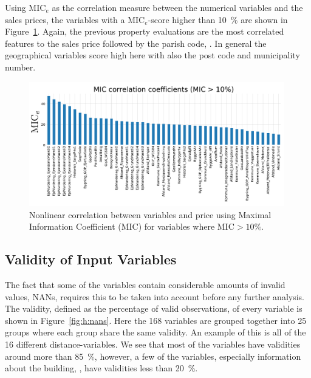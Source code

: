 Using $\mathrm{MIC}_e$ as the correlation measure between the numerical variables and the sales prices, the variables with a $\mathrm{MIC}_e$-score higher than \SI{10}{\percent} are shown in Figure~\ref{fig:h:corr_MIC}. Again, the previous property evaluations are the most correlated features to the sales price followed by the parish code, . In general the geographical variables score high here with also the post code and municipality number. 

\begin{figure}
  \centerfloat
  \includegraphics[width=0.99\textwidth, trim=0 10 0 40, clip]{figures/housing/MIC_plot.pdf}
  \caption[Nonlinear Correlation Between Variables and Price]
          {Nonlinear correlation between variables and price using Maximal Information Coefficient (MIC) for variables where $\text{MIC}>10\%$.}
  \label{fig:h:corr_MIC}
\end{figure}

\subsection{Validity of Input Variables}

The fact that some of the variables contain considerable amounts of invalid values, NANs, requires this to be taken into account before any further analysis. The validity, defined as the percentage of valid observations, of every variable is shown in Figure~\ref{fig:h:nans}. Here the \num{168} variables are grouped together into \num{25} groups where each group share the same validity. An example of this is all of the \num{16} different distance-variables. We see that most of the variables have validities around more than 
\SI{85}{\percent}, however, a few of the variables, especially information about the building, , have validities less than \SI{20}{\percent}. 

